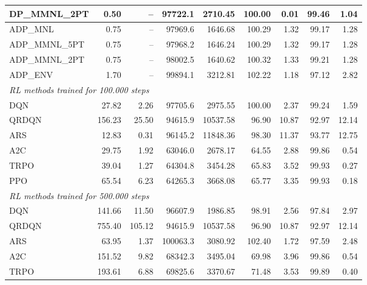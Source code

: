 \begin{samepage}
\begin{center}
\begin{tabular}{l|rr|rr|rr|rr}
    DP\_MMNL\_2PT &     0.50 &    -- &    97722.1 &    2710.45 &  100.00 &    0.01 &   99.46 &    1.04 \\
    \midrule
    ADP\_MNL     &     0.75 &    -- &    97969.6 &    1646.68 &  100.29 &    1.32 &   99.17 &    1.28 \\
    ADP\_MMNL\_5PT &     0.75 &    -- &    97968.2 &    1646.24 &  100.29 &    1.32 &   99.17 &    1.28 \\
    ADP\_MMNL\_2PT &     0.75 &    -- &    98002.5 &    1640.62 &  100.32 &    1.33 &   99.21 &    1.28 \\
    ADP\_ENV     &     1.70 &    -- &    99894.1 &    3212.81 &  102.22 &    1.18 &   97.12 &    2.82 \\
    \midrule
    \multicolumn{9}{l}{\textit{RL methods trained for 100.000 steps}} \\
    \midrule
    DQN          &    27.82 &     2.26 &    97705.6 &    2975.55 &  100.00 &    2.37 &   99.24 &    1.59 \\
    QRDQN        &   156.23 &    25.50 &    94615.9 &   10537.58 &   96.90 &   10.87 &   92.97 &   12.14 \\
    ARS          &    12.83 &     0.31 &    96145.2 &   11848.36 &   98.30 &   11.37 &   93.77 &   12.75 \\
    A2C          &    29.75 &     1.92 &    63046.0 &    2678.17 &   64.55 &    2.88 &   99.86 &    0.54 \\
    TRPO         &    39.04 &     1.27 &    64304.8 &    3454.28 &   65.83 &    3.52 &   99.93 &    0.27 \\
    PPO          &    65.54 &     6.23 &    64265.3 &    3668.08 &   65.77 &    3.35 &   99.93 &    0.18 \\
    \midrule
    \multicolumn{9}{l}{\textit{RL methods trained for 500.000 steps}} \\
    \midrule
    DQN          &   141.66 &    11.50 &    96607.9 &    1986.85 &   98.91 &    2.56 &   97.84 &    2.97 \\
    QRDQN        &   755.40 &   105.12 &    94615.9 &   10537.58 &   96.90 &   10.87 &   92.97 &   12.14 \\
    ARS          &    63.95 &     1.37 &   100063.3 &    3080.92 &  102.40 &    1.72 &   97.59 &    2.48 \\
    A2C          &   151.52 &     9.82 &    68342.3 &    3495.04 &   69.98 &    3.96 &   99.86 &    0.54 \\
    TRPO         &   193.61 &     6.88 &    69825.6 &    3370.67 &   71.48 &    3.53 &   99.89 &    0.40 \\

\end{tabular}
\end{center}
\end{samepage}
